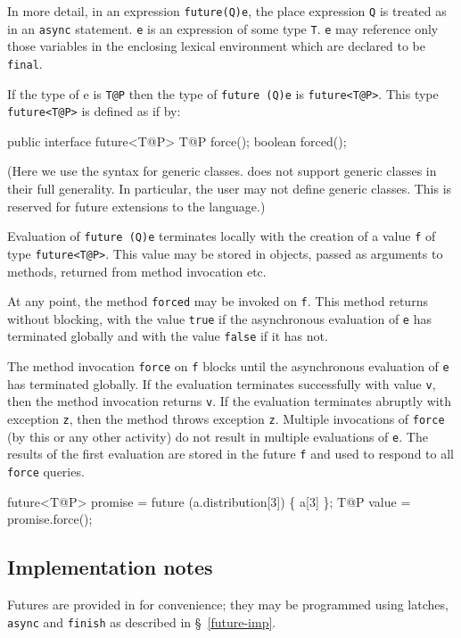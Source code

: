 In more detail, in an expression {\tt future(Q){e}}, the place
expression {\tt Q} is treated as in an {\tt async} statement. {\tt e}
is an expression of some type {\tt T}. {\tt e} may reference only
those variables in the enclosing lexical environment which are
declared to be {\tt final}.

If the type of {\cf e} is {\tt T@P} then the type of
{\tt future (Q){e}} is {\tt future<T@P>}.  This 
type {\tt future<T@P>} is defined as if by:
\begin{x10}
  public interface future<T@P> {
    T@P force();
    boolean forced();
  }
\end{x10}

(Here we use the syntax for generic classes. \XtenCurrVer{} does not support
generic classes in their full generality. In particular, the user may
not define generic classes. This is reserved for future extensions to the
language.)

Evaluation of {\tt future (Q){e}} terminates locally with the creation
of a value {\tt f} of type {\tt future<T@P>}.  This value may be
stored in objects, passed as arguments to methods, returned from
method invocation etc. 

At any point, the method {\tt forced} may be invoked on {\tt f}. This
method returns without blocking, with the value {\tt true} if the
asynchronous evaluation of {\tt e} has terminated globally and with
the value {\tt false} if it has not.

The method invocation {\tt force} on {\tt f} blocks until the
asynchronous evaluation of {\tt e} has terminated globally. If the
evaluation terminates successfully with value {\tt v}, then the method
invocation returns {\tt v}. If the evaluation terminates abruptly with
exception {\tt z}, then the method throws exception {\tt z}. Multiple
invocations of {\tt force} (by this or any other activity) do not
result in multiple evaluations of {\tt e}. The results of the first
evaluation are stored in the future {\tt f} and used to respond to all
{\tt force} queries.

\begin{x10}
 future<T@P> promise = future (a.distribution[3]) \{ a[3] \};
 T@P value = promise.force();
\end{x10}

\subsection{Implementation notes}
Futures are provided in \Xten{} for convenience; they may be
programmed using latches, {\tt async} and {\tt finish} as
described in \S~\ref{future-imp}.

